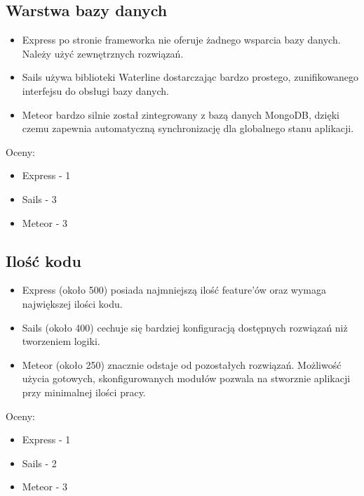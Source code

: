 \documentclass[12pt]{report}
\begin{document}
    \subsection{Warstwa bazy danych}
      \begin{itemize}
        \item Express po stronie frameworka nie oferuje żadnego wsparcia bazy danych. Należy użyć zewnętrznych rozwiązań.
        \item Sails używa biblioteki Waterline dostarczając bardzo prostego, zunifikowanego interfejsu do obsługi bazy danych.
        \item Meteor bardzo silnie został zintegrowany z bazą danych MongoDB, dzięki czemu zapewnia automatyczną synchronizację dla globalnego stanu aplikacji.
      \end{itemize}
      Oceny:
      \begin{itemize}
        \item Express - 1
        \item Sails - 3
        \item Meteor - 3
      \end{itemize}
      
    \subsection{Ilość kodu}
      \begin{itemize}
        \item Express (około 500) posiada najmniejszą ilość feature'ów oraz wymaga największej ilości kodu.
        \item Sails (około 400) cechuje się bardziej konfiguracją dostępnych rozwiązań niż tworzeniem logiki. 
        \item Meteor (około 250) znacznie odstaje od pozostałych rozwiązań. Możliwość użycia gotowych, skonfigurowanych modułów pozwala na stworznie aplikacji przy minimalnej ilości pracy.
      \end{itemize}
      Oceny:
      \begin{itemize}
        \item Express - 1
        \item Sails - 2
        \item Meteor - 3
      \end{itemize}
      
\end{document}
